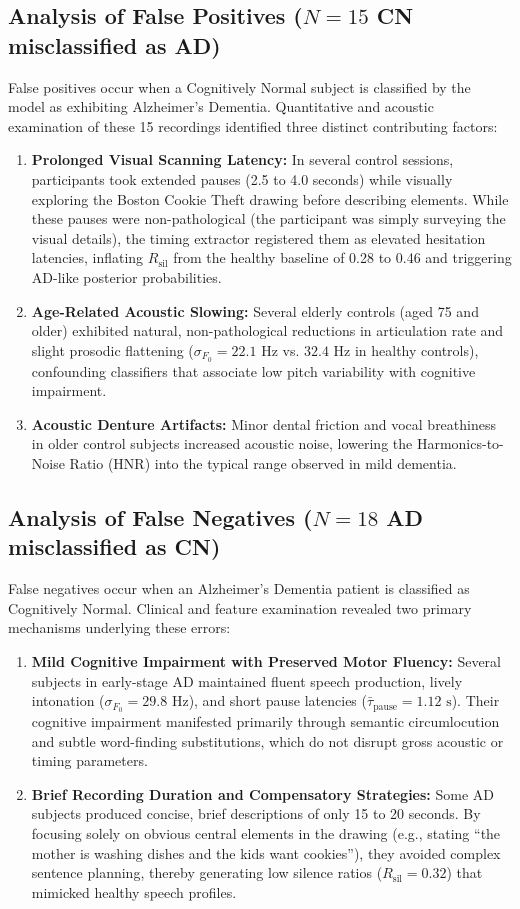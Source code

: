 \documentclass[conference]{IEEEtran}
\begin{document}
\subsection{Analysis of False Positives ($N = 15$ CN misclassified as AD)}
False positives occur when a Cognitively Normal subject is classified by the model as exhibiting Alzheimer's Dementia. Quantitative and acoustic examination of these 15 recordings identified three distinct contributing factors:
\begin{enumerate}
    \item \textbf{Prolonged Visual Scanning Latency:} In several control sessions, participants took extended pauses (2.5 to 4.0 seconds) while visually exploring the Boston Cookie Theft drawing before describing elements. While these pauses were non-pathological (the participant was simply surveying the visual details), the timing extractor registered them as elevated hesitation latencies, inflating $R_{\text{sil}}$ from the healthy baseline of 0.28 to 0.46 and triggering AD-like posterior probabilities.
    \item \textbf{Age-Related Acoustic Slowing:} Several elderly controls (aged 75 and older) exhibited natural, non-pathological reductions in articulation rate and slight prosodic flattening ($\sigma_{F_0} = 22.1\text{ Hz}$ vs. $32.4\text{ Hz}$ in healthy controls), confounding classifiers that associate low pitch variability with cognitive impairment.
    \item \textbf{Acoustic Denture Artifacts:} Minor dental friction and vocal breathiness in older control subjects increased acoustic noise, lowering the Harmonics-to-Noise Ratio (HNR) into the typical range observed in mild dementia.
\end{enumerate}

\subsection{Analysis of False Negatives ($N = 18$ AD misclassified as CN)}
False negatives occur when an Alzheimer's Dementia patient is classified as Cognitively Normal. Clinical and feature examination revealed two primary mechanisms underlying these errors:
\begin{enumerate}
    \item \textbf{Mild Cognitive Impairment with Preserved Motor Fluency:} Several subjects in early-stage AD maintained fluent speech production, lively intonation ($\sigma_{F_0} = 29.8\text{ Hz}$), and short pause latencies ($\bar{\tau}_{\text{pause}} = 1.12\text{ s}$). Their cognitive impairment manifested primarily through semantic circumlocution and subtle word-finding substitutions, which do not disrupt gross acoustic or timing parameters.
    \item \textbf{Brief Recording Duration and Compensatory Strategies:} Some AD subjects produced concise, brief descriptions of only 15 to 20 seconds. By focusing solely on obvious central elements in the drawing (e.g., stating ``the mother is washing dishes and the kids want cookies''), they avoided complex sentence planning, thereby generating low silence ratios ($R_{\text{sil}} = 0.32$) that mimicked healthy speech profiles.
\end{enumerate}
\end{document}
